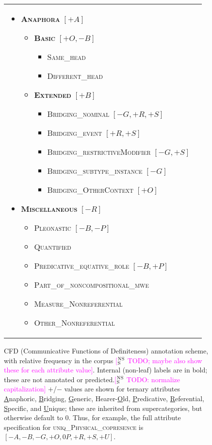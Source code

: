 \documentclass[11pt,letterpaper]{article}
\newcommand{\ensuretext}[1]{#1}
\newcommand{\nssmarker}{\ensuretext{\textcolor{magenta}{\ensuremath{^{\textsc{NS}}_{\textsc{S}}}}}}
\newcommand{\arkcomment}[3]{\ensuretext{\textcolor{#3}{[#1 #2]}}}
\newcommand{\nss}[1]{\arkcomment{\nssmarker}{#1}{magenta}}
\newcommand{\ilbl}[1]{\mbox{\textbf{\textsc{#1}}}} %
\newcommand{\llbl}[1]{\mbox{\textsc{#1}}} %
\newcommand{\costversion}[1]{}
\begin{document}
\begin{figure*}
\begin{tabular}{p{}p{}}
\begin{itemize}
\item    \ilbl{Anaphora} $[+A]$
  \begin{itemize}
  \item      \ilbl{Basic} $[+O,-B]$
    \begin{itemize}
    \item        \llbl{Same\_head}
    \item        \llbl{Different\_head}
    \end{itemize}
  \item  \ilbl{Extended} $[+B]$
    \begin{itemize}
    \item        \llbl{Bridging\_nominal} $[-G,+R,+S]$
    \item        \llbl{Bridging\_event} $[+R,+S]$
    \item        \llbl{Bridging\_restrictiveModifier} $[-G,+S]$
    \item        \llbl{Bridging\_subtype\_instance} $[-G]$
    \item        \llbl{Bridging\_OtherContext} $[+O]$
    \end{itemize}
  \end{itemize}
\item \ilbl{Miscellaneous} $[-R]$
  \begin{itemize}
	\item \llbl{Pleonastic} $[-B,-P]$
	\item \llbl{Quantified}
	\item \llbl{Predicative\_equative\_role} $[-B,+P]$
	\item \llbl{Part\_of\_noncompositional\_mwe}
	\item \llbl{Measure\_Nonreferential}
	\item \llbl{Other\_Nonreferential}
  \end{itemize}
\end{itemize}
\end{tabular}
\caption{CFD (Communicative Functions of Definiteness) annotation scheme, with relative frequency in the corpus \nss{TODO; maybe also show these for each attribute value}. Internal (non-leaf) labels are in bold;\costversion{\nss{}} these are not annotated or predicted.\nss{TODO: normalize capitalization}
$+$/$-$ values are shown for ternary attributes \uline{A}naphoric, \uline{B}ridging, \uline{G}eneric, Hearer-\uline{O}ld, \uline{P}redicative, \uline{R}eferential, \uline{S}pecific, and \uline{U}nique; 
these are inherited from supercategories, but otherwise default to $0$.
Thus, for example, the full attribute specification for \llbl{uniq\_Physical\_copresence} is $[-A,-B,-G,+O,0P,+R,+S,+U]$.}
\label{fig:hierarchy}
\end{figure*}
\end{document}
